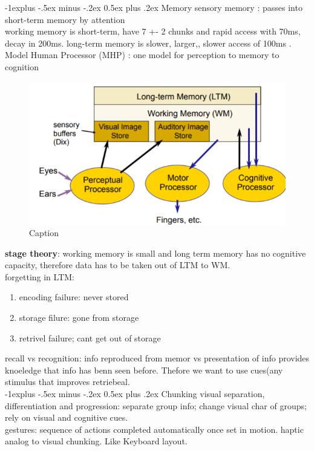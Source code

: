\documentclass[10pt,landscape]{article}
\makeatletter
\renewcommand{\subsection}{\@startsection{subsection}{2}{0mm}%
                                {-1explus -.5ex minus -.2ex}%
                                {0.5ex plus .2ex}%
                                {\normalfont\normalsize\bfseries}}
\theoremstyle{definition}
\makeatother
\begin{document}
\begin{multicols}{3}
\subsection{Memory}
sensory memory : passes into short-term memory by attention  \\
working memory is short-term, have 7 +- 2 chunks and rapid access with 70ms, decay in 200ms.  long-term memory is slower, larger,, slower access of 100ms . 
Model Human Processor (MHP) : one model for perception to memory to cognition\\
\begin{figure}[H]
    \centering
    \includegraphics[width=\linewidth]{model.png}
    \caption{Caption}
    \label{fig:my_label}
\end{figure}

\textbf{stage theory}: working memory is small and long term memory has no cognitive capacity, therefore data has to be taken out of LTM to WM. \\
forgetting in LTM: 
\begin{enumerate}
    \item encoding failure: never stored
    \item storage filure: gone from storage
    \item retrivel failure; cant get out of storage
\end{enumerate}
recall vs recognition: info reproduced from memor vs presentation of info provides knoeledge that info has benn seen before. Thefore we want to use cues(any stimulus that improves retriebeal.  \\

\subsection{Chunking}
visual separation, differentiation and progression: separate group info; change visual char of groups; rely on visual and cognitive cues.  \\
gestures: sequence of actions completed automatically once set
in motion. haptic analog to visual chunking. Like Keyboard layout. \\





\end{multicols}
\end{document}
